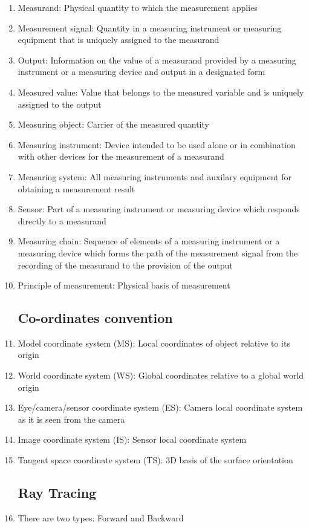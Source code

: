 
\begin{enumerate}

\item Measurand: Physical quantity to which the measurement applies
\item Measurement signal: Quantity in a measuring instrument or measuring equipment that is uniquely assigned to
the measurand
\item Output: Information on the value of a measurand provided by a measuring instrument or a measuring device
and output in a designated form
\item Measured value: Value that belongs to the measured variable and is uniquely assigned to the output
\item Measuring object: Carrier of the measured quantity
\item Measuring instrument: Device intended to be used alone or in combination with other devices for the
measurement of a measurand
\item Measuring system: All measuring instruments and auxilary equipment for obtaining a measurement result
\item Sensor: Part of a measuring instrument or measuring device which responds directly to a measurand
\item Measuring chain: Sequence of elements of a measuring instrument or a measuring device which forms the
path of the measurement signal from the recording of the measurand to the provision of the output
\item Principle of measurement: Physical basis of measurement

\subsection{Co-ordinates convention}
\item Model coordinate system (MS): Local coordinates of object relative to its origin
\item World coordinate system (WS): Global coordinates relative to a global world origin
\item Eye/camera/sensor coordinate system (ES): Camera local coordinate system as it is seen from the camera
\item Image coordinate system (IS): Sensor local coordinate system
\item Tangent space coordinate system (TS): 3D basis of the surface orientation

\subsection{Ray Tracing}
\item There are two types: Forward and Backward


\end{enumerate}